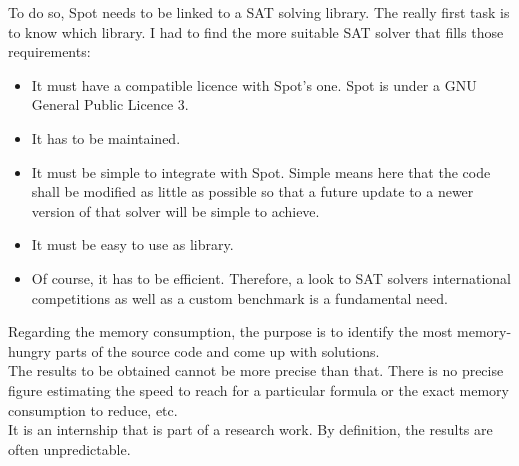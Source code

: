 To do so, Spot needs to be linked to a SAT solving library. The really first task is to know which library. I had
to find the more suitable SAT solver that fills those requirements:
\begin{itemize}
 \item It must have a compatible licence with Spot's one. Spot is under a GNU General Public Licence 3.
 \item It has to be maintained.
 \item It must be simple to integrate with Spot. Simple means here that the code shall be modified as little
       as possible so that a future update to a newer version of that solver will be simple to achieve.
 \item It must be easy to use as library.
 \item Of course, it has to be efficient. Therefore, a look to SAT solvers international competitions as
       well as a custom benchmark is a fundamental need.
\end{itemize}

\noindent Regarding the memory consumption, the purpose is to identify the most memory-hungry parts of the
source code and come up with solutions.\\

The results to be obtained cannot be more precise than that. There is no precise figure estimating the
speed to reach for a particular formula or the exact memory consumption to reduce, etc.\\

It is an internship that is part of a research work. By definition, the results are often unpredictable.
